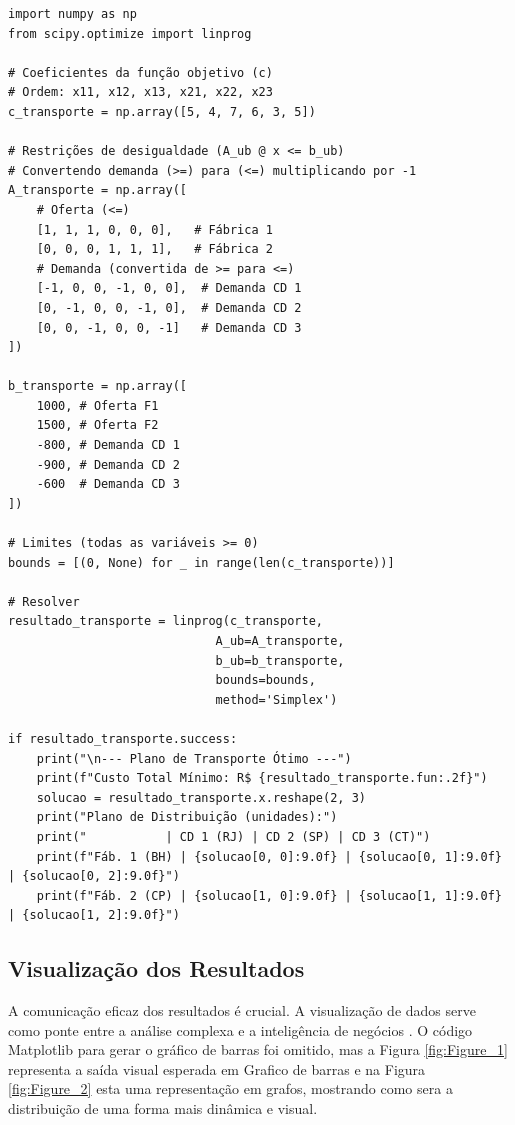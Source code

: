 \documentclass[conference]{IEEEtran}
\begin{document}
\begin{lstlisting}
import numpy as np
from scipy.optimize import linprog

# Coeficientes da função objetivo (c)
# Ordem: x11, x12, x13, x21, x22, x23
c_transporte = np.array([5, 4, 7, 6, 3, 5])

# Restrições de desigualdade (A_ub @ x <= b_ub)
# Convertendo demanda (>=) para (<=) multiplicando por -1
A_transporte = np.array([
    # Oferta (<=)
    [1, 1, 1, 0, 0, 0],   # Fábrica 1
    [0, 0, 0, 1, 1, 1],   # Fábrica 2
    # Demanda (convertida de >= para <=)
    [-1, 0, 0, -1, 0, 0],  # Demanda CD 1
    [0, -1, 0, 0, -1, 0],  # Demanda CD 2
    [0, 0, -1, 0, 0, -1]   # Demanda CD 3
])

b_transporte = np.array([
    1000, # Oferta F1
    1500, # Oferta F2
    -800, # Demanda CD 1
    -900, # Demanda CD 2
    -600  # Demanda CD 3
])

# Limites (todas as variáveis >= 0)
bounds = [(0, None) for _ in range(len(c_transporte))]

# Resolver
resultado_transporte = linprog(c_transporte, 
                             A_ub=A_transporte, 
                             b_ub=b_transporte, 
                             bounds=bounds, 
                             method='Simplex')

if resultado_transporte.success:
    print("\n--- Plano de Transporte Ótimo ---")
    print(f"Custo Total Mínimo: R$ {resultado_transporte.fun:.2f}")
    solucao = resultado_transporte.x.reshape(2, 3)
    print("Plano de Distribuição (unidades):")
    print("           | CD 1 (RJ) | CD 2 (SP) | CD 3 (CT)")
    print(f"Fáb. 1 (BH) | {solucao[0, 0]:9.0f} | {solucao[0, 1]:9.0f} | {solucao[0, 2]:9.0f}")
    print(f"Fáb. 2 (CP) | {solucao[1, 0]:9.0f} | {solucao[1, 1]:9.0f} | {solucao[1, 2]:9.0f}")
\end{lstlisting}

\subsection{Visualização dos Resultados}
A comunicação eficaz dos resultados é crucial. A visualização de dados serve como ponte entre a análise complexa e a inteligência de negócios \cite{cordeiro}. O código Matplotlib para gerar o gráfico de barras foi omitido, mas a Figura \ref{fig:Figure_1} representa a saída visual esperada em Grafico de barras e na Figura \ref{fig:Figure_2} esta uma representação em grafos, mostrando como sera a distribuição de uma forma mais dinâmica e visual.
\end{document}
